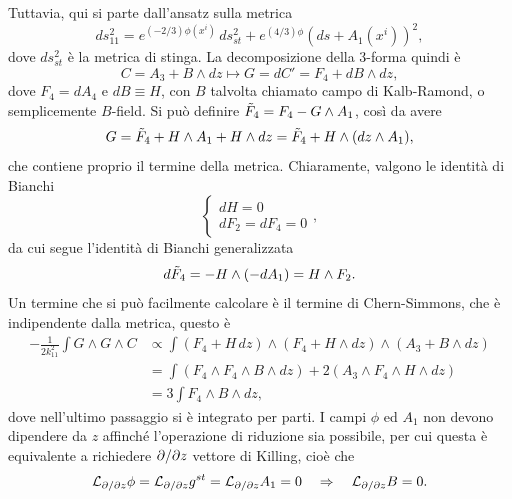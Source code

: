 Tuttavia, qui si parte dall'ansatz sulla metrica 
\begin{equation}
    ds_{11}^2 = e^{(-2/3)\phi(x^i)}\,ds^2_{st} + e^{(4/3)\phi}(ds + A_1(x^i))^2,
\end{equation}
dove $ds^2_{st}$ è la metrica di stinga. La decomposizione della 3-forma quindi è 
\begin{equation}
    C = A_3 + B \wedge dz \mapsto G = dC' = F_4 + dB \wedge dz,
\end{equation}
dove $F_4 = dA_4$ e $dB \equiv H$, con $B$ talvolta chiamato campo di Kalb-Ramond, o semplicemente $B$-field. Si può definire $\tilde{F}_4 = F_4 - G \wedge A_1$, così da avere 
\begin{equation}
    G = \tilde{F}_4 + H \wedge A_1 + H \wedge dz = \tilde{F}_4 + H \wedge (dz \wedge A_1),
\end{equation}
che contiene proprio il termine della metrica. Chiaramente, valgono le identità di Bianchi
\begin{equation}
    \begin{cases}
        dH = 0 \\
        dF_2 = dF_4 = 0
    \end{cases},
\end{equation}
da cui segue l'identità di Bianchi generalizzata 
\begin{equation}
    d\tilde{F}_4 = -H \wedge (-dA_1) = H \wedge F_2.
\end{equation}
Un termine che si può facilmente calcolare è il termine di Chern-Simmons, che è indipendente dalla metrica, questo è 
\begin{equation}
    \begin{split}
        -\frac{1}{2k_{11}^2}\int G \wedge G \wedge C &\propto \int (F_4 + H\,dz) \wedge (F_4 + H \wedge dz) \wedge (A_3 + B \wedge dz) \\
        &= \int (F_4 \wedge F_4 \wedge B \wedge dz) + 2(A_3 \wedge F_4 \wedge H \wedge dz) \\
        &= 3\int F_4 \wedge B \wedge dz,
    \end{split}
\end{equation}
dove nell'ultimo passaggio si è integrato per parti. I campi $\phi$ ed $A_1$ non devono dipendere da $z$ affinché l'operazione di riduzione sia possibile, per cui questa è equivalente a richiedere $\partial/\partial z$ vettore di Killing, cioè che 
\begin{equation}
    \mathcal{L}_{\partial/\partial z}\phi = \mathcal{L}_{\partial/\partial z}g^{st} = \mathcal{L}_{\partial/\partial z}A_1 = 0\quad \Rightarrow \quad \mathcal{L}_{\partial/\partial z}B = 0.
\end{equation}
